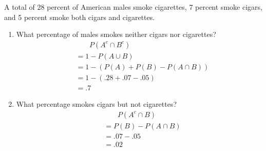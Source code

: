 \item A total of 28 percent of American males smoke cigarettes, 7 percent smoke cigars, and 5 percent smoke both cigars and cigarettes.
\begin{enumerate}
    \item What percentage of males smokes neither cigars nor cigarettes?
    \begin{align*}
        &{\phantom{\;=\;}} P(A^c \cap B^c)\\
        &= 1 - P(A \cup B)\\
        &= 1 - (P(A) + P(B) - P(A \cap B))\\
        &= 1 - (.28 + .07 - .05)\\
        &= .7
    \end{align*}
    \item What percentage smokes cigars but not cigarettes?
    \begin{align*}
        &{\phantom{\;=\;}} P(A^c \cap B)\\
        &= P(B) - P(A \cap B)\\
        &= .07 - .05\\
        &= .02
    \end{align*}
\end{enumerate}